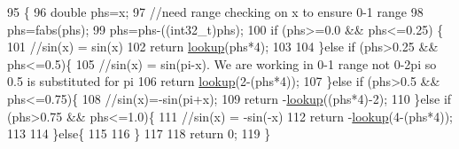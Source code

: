 \begin{DoxyCode}
95                                                               \{
96                 \textcolor{keywordtype}{double} phs=x;
97                 \textcolor{comment}{//need range checking on x to ensure 0-1 range}
98                 phs=fabs(phs);
99                 phs=phs-((int32\_t)phs);
100                 \textcolor{keywordflow}{if} (phs>=0.0 && phs<=0.25) \{
101                     \textcolor{comment}{//sin(x) = sin(x)}
102                     \textcolor{keywordflow}{return} \hyperlink{classDSG_1_1Backend_1_1SmallSineLUT_3_01int32__t_00_01size_01_4_a9635d6cb5dd66d17c61ce09b3e437217}{lookup}(phs*4);
103                     
104                 \}\textcolor{keywordflow}{else} \textcolor{keywordflow}{if} (phs>0.25 && phs<=0.5)\{
105                     \textcolor{comment}{//sin(x) =      sin(pi-x). We are working in 0-1 range not 0-2pi so 0.5 is substituted
       for pi}
106                     \textcolor{keywordflow}{return} \hyperlink{classDSG_1_1Backend_1_1SmallSineLUT_3_01int32__t_00_01size_01_4_a9635d6cb5dd66d17c61ce09b3e437217}{lookup}(2-(phs*4));
107                 \}\textcolor{keywordflow}{else} \textcolor{keywordflow}{if} (phs>0.5 && phs<=0.75)\{
108                     \textcolor{comment}{//sin(x)=-sin(pi+x);}
109                     \textcolor{keywordflow}{return} -\hyperlink{classDSG_1_1Backend_1_1SmallSineLUT_3_01int32__t_00_01size_01_4_a9635d6cb5dd66d17c61ce09b3e437217}{lookup}((phs*4)-2);
110                 \}\textcolor{keywordflow}{else} \textcolor{keywordflow}{if} (phs>0.75 && phs<=1.0)\{
111                     \textcolor{comment}{//sin(x) = -sin(-x)}
112                     \textcolor{keywordflow}{return} -\hyperlink{classDSG_1_1Backend_1_1SmallSineLUT_3_01int32__t_00_01size_01_4_a9635d6cb5dd66d17c61ce09b3e437217}{lookup}(4-(phs*4));
113                     
114                 \}\textcolor{keywordflow}{else}\{
115                     
116                 \}
117                 
118                 \textcolor{keywordflow}{return} 0;
119             \}
\end{DoxyCode}
